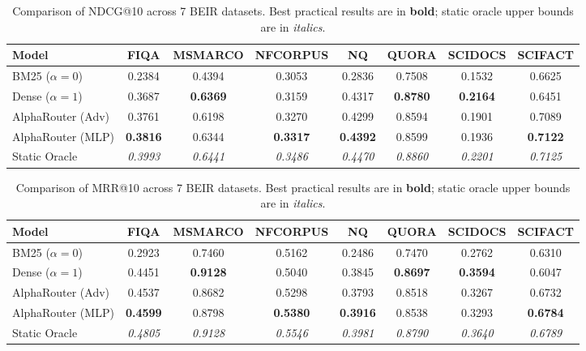 \begin{table}[t]
\centering
\caption{Comparison of NDCG@10 across 7 BEIR datasets. Best practical results are in \textbf{bold}; static oracle upper bounds are in \textit{italics}.}
\label{tab:ndcg_10}
\begin{tabular}{lccccccc}
\toprule
Model & FIQA & MSMARCO & NFCORPUS & NQ & QUORA & SCIDOCS & SCIFACT \\
\midrule
BM25 ($\alpha=0$) & 0.2384 & 0.4394 & 0.3053 & 0.2836 & 0.7508 & 0.1532 & 0.6625 \\
Dense ($\alpha=1$) & 0.3687 & \textbf{0.6369} & 0.3159 & 0.4317 & \textbf{0.8780} & \textbf{0.2164} & 0.6451 \\
\midrule
AlphaRouter (Adv) & 0.3761 & 0.6198 & 0.3270 & 0.4299 & 0.8594 & 0.1901 & 0.7089 \\
AlphaRouter (MLP) & \textbf{0.3816} & 0.6344 & \textbf{0.3317} & \textbf{0.4392} & 0.8599 & 0.1936 & \textbf{0.7122} \\
\midrule
Static Oracle & \textit{0.3993} & \textit{0.6441} & \textit{0.3486} & \textit{0.4470} & \textit{0.8860} & \textit{0.2201} & \textit{0.7125} \\
\bottomrule
\end{tabular}
\end{table}


\begin{table}[t]
\centering
\caption{Comparison of MRR@10 across 7 BEIR datasets. Best practical results are in \textbf{bold}; static oracle upper bounds are in \textit{italics}.}
\label{tab:mrr_10}
\begin{tabular}{lccccccc}
\toprule
Model & FIQA & MSMARCO & NFCORPUS & NQ & QUORA & SCIDOCS & SCIFACT \\
\midrule
BM25 ($\alpha=0$) & 0.2923 & 0.7460 & 0.5162 & 0.2486 & 0.7470 & 0.2762 & 0.6310 \\
Dense ($\alpha=1$) & 0.4451 & \textbf{0.9128} & 0.5040 & 0.3845 & \textbf{0.8697} & \textbf{0.3594} & 0.6047 \\
\midrule
AlphaRouter (Adv) & 0.4537 & 0.8682 & 0.5298 & 0.3793 & 0.8518 & 0.3267 & 0.6732 \\
AlphaRouter (MLP) & \textbf{0.4599} & 0.8798 & \textbf{0.5380} & \textbf{0.3916} & 0.8538 & 0.3293 & \textbf{0.6784} \\
\midrule
Static Oracle & \textit{0.4805} & \textit{0.9128} & \textit{0.5546} & \textit{0.3981} & \textit{0.8790} & \textit{0.3640} & \textit{0.6789} \\
\bottomrule
\end{tabular}
\end{table}

